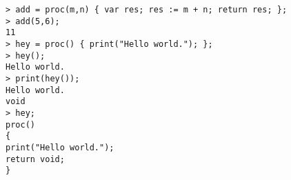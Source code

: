 \begin{center}\begin{minipage}{15cm}\begin{Verbatim}[frame=single]
> add = proc(m,n) { var res; res := m + n; return res; };
> add(5,6);
11
> hey = proc() { print("Hello world."); };
> hey();
Hello world.
> print(hey());
Hello world.
void
> hey;
proc()
{
print("Hello world.");
return void;
}
\end{Verbatim}
\end{minipage}\end{center}
